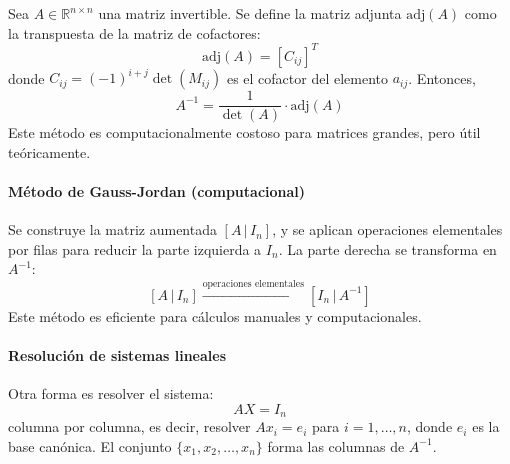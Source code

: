 Sea \(A \in \mathbb{R}^{n \times n}\) una matriz invertible. Se define la matriz adjunta \(\text{adj}(A)\) como la transpuesta de la matriz de cofactores:
\[
\text{adj}(A) = \left[ C_{ij} \right]^T
\]
donde \(C_{ij} = (-1)^{i+j} \det(M_{ij})\) es el cofactor del elemento \(a_{ij}\). Entonces,
\[
A^{-1} = \frac{1}{\det(A)} \cdot \text{adj}(A)
\]
Este método es computacionalmente costoso para matrices grandes, pero útil teóricamente.

\paragraph{Método de Gauss-Jordan (computacional)}

Se construye la matriz aumentada \([A \,|\, I_n]\), y se aplican operaciones elementales por filas para reducir la parte izquierda a \(I_n\). La parte derecha se transforma en \(A^{-1}\):
\[
[A \,|\, I_n] \xrightarrow{\text{operaciones elementales}} [I_n \,|\, A^{-1}]
\]
Este método es eficiente para cálculos manuales y computacionales.

\paragraph{Resolución de sistemas lineales}

Otra forma es resolver el sistema:
\[
AX = I_n
\]
columna por columna, es decir, resolver \(Ax_i = e_i\) para \(i = 1, \dots, n\), donde \(e_i\) es la base canónica. El conjunto \(\{x_1, x_2, \dots, x_n\}\) forma las columnas de \(A^{-1}\).